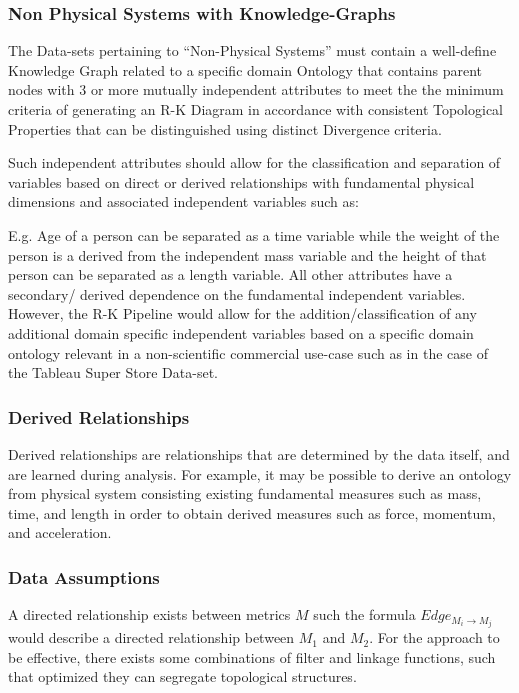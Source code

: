 \subsubsection{Non Physical Systems with Knowledge-Graphs}
\label{sec:NonPhysical}

The Data-sets pertaining to “Non-Physical Systems” must contain a well-define Knowledge Graph related to a specific domain Ontology that contains parent nodes with 3 or more mutually independent attributes to meet the the minimum criteria of  generating an  R-K Diagram in accordance with consistent Topological Properties that can be distinguished using distinct Divergence criteria.

Such independent attributes should allow for the classification and separation of variables based on direct or derived relationships with fundamental physical dimensions and associated independent variables such as:

E.g. Age of a person can be separated as a time variable while the weight of the person is a derived from the independent mass variable and the height of that person can be separated as a length variable. All other attributes have a secondary/ derived dependence on the fundamental independent variables. However, the R-K Pipeline would allow for the addition/classification of any  additional domain specific independent variables based on a specific domain ontology relevant in a non-scientific commercial use-case such as in the case of the Tableau Super Store Data-set.\cite{TableauSuperStore}

\subsubsection{Derived Relationships}
Derived relationships are relationships that are determined by the data itself, and are learned during analysis. For example, it may be possible to derive an ontology from physical system consisting existing fundamental measures such as mass, time, and length in order to obtain derived measures such as force, momentum, and acceleration.

\subsubsection{Data Assumptions}

A directed relationship exists between metrics $M$ such the formula $Edge_{M_{i} \to M_{j}}$ would describe a directed relationship between $M_{1}$ and $M_{2}$. For the approach to be effective, there exists some combinations of filter and linkage functions, such that optimized they can segregate topological structures.

